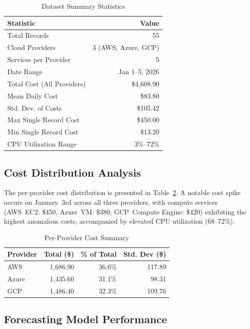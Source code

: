 \documentclass[conference]{IEEEtran}
\begin{document}
\begin{table}[htbp]
\caption{Dataset Summary Statistics}
\label{tab:dataset}
\centering
\begin{tabular}{@{}lr@{}}
\toprule
\textbf{Statistic} & \textbf{Value} \\
\midrule
Total Records & 55 \\
Cloud Providers & 3 (AWS, Azure, GCP) \\
Services per Provider & 5 \\
Date Range & Jan 1--5, 2026 \\
Total Cost (All Providers) & \$4,608.90 \\
Mean Daily Cost & \$83.80 \\
Std. Dev. of Costs & \$105.42 \\
Max Single Record Cost & \$450.00 \\
Min Single Record Cost & \$13.20 \\
CPU Utilization Range & 3\%--72\% \\
\bottomrule
\end{tabular}
\end{table}

\subsection{Cost Distribution Analysis}

The per-provider cost distribution is presented in Table~\ref{tab:provider_summary}. A notable cost spike occurs on January~3rd across all three providers, with compute services (AWS~EC2: \$450, Azure~VM: \$380, GCP~Compute Engine: \$420) exhibiting the highest anomalous costs, accompanied by elevated CPU utilization (68--72\%).

\begin{table}[htbp]
\caption{Per-Provider Cost Summary}
\label{tab:provider_summary}
\centering
\begin{tabular}{@{}lrrr@{}}
\toprule
\textbf{Provider} & \textbf{Total (\$)} & \textbf{\% of Total} & \textbf{Std. Dev (\$)} \\
\midrule
AWS & 1,686.90 & 36.6\% & 117.89 \\
Azure & 1,435.60 & 31.1\% & 98.31 \\
GCP & 1,486.40 & 32.3\% & 109.76 \\
\bottomrule
\end{tabular}
\end{table}

\subsection{Forecasting Model Performance}
\end{document}
